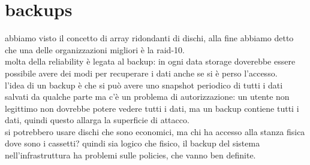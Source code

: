 \documentclass[12pt, oneside]{extbook} %
\begin{document}
\section{backups}
abbiamo visto il concetto di array ridondanti di dischi, alla fine abbiamo detto che una delle organizzazioni migliori è la raid-10.\\molta della reliability è legata al backup: in ogni data storage doverebbe essere possibile avere dei modi per recuperare i dati anche se si è perso l'accesso.\\l'idea di un backup è che si può avere uno snapshot periodico di tutti i dati salvati da qualche parte ma c'è un problema di autorizzazione: un utente non legittimo non dovrebbe potere vedere tutti i dati, ma un backup contiene tutti i dati, quindi questo allarga la superficie di attacco.\\si potrebbero usare dischi che sono economici, ma chi ha accesso alla stanza fisica dove sono i cassetti? quindi sia logico che fisico, il backup del sistema nell'infrastruttura ha problemi sulle policies, che vanno ben definite.
\end{document}
